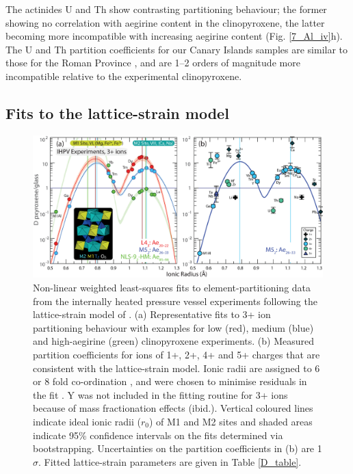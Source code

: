 \documentclass[final,authoryear,3p,times,twocolumn]{elsarticle}
\begin{document}
	The actinides U and Th show contrasting partitioning behaviour; the former showing no correlation with aegirine content in the clinopyroxene, the latter becoming more incompatible with increasing aegirine content (Fig. \ref{7_Al_iv}h). The U and Th partition coefficients for our Canary Islands samples are similar to those for the Roman Province \citep{Wood2001cpx, Fedele2009, Mollo2013, Mollo2016}, and are 1--2 orders of magnitude more incompatible relative to the experimental clinopyroxene.



\subsection{Fits to the lattice-strain model}

        \begin{figure}[tb]
        \begin{center}
        \includegraphics[width=1\textwidth]{8_Latticestrain-01.eps}
        \caption[Lattice-strain fits to  element-partition coefficients]{Non-linear weighted least-squares fits to element-partitioning data from the internally heated pressure vessel experiments following the lattice-strain model of \citet{Blundy1994}. (a) Representative fits to 3+ ion partitioning behaviour with examples for low (red), medium (blue) and high-aegirine (green) clinopyroxene experiments. (b) Measured partition coefficients for ions of 1+, 2+, 4+ and 5+ charges that are consistent with the lattice-strain model. Ionic radii are assigned to 6 or 8 fold co-ordination \citep{Shannon1976}, and were chosen to minimise residuals in the fit \citep[cf.][]{Olin2010}. Y was not included in the fitting routine for 3+ ions because of mass fractionation effects (ibid.).
        Vertical coloured lines indicate ideal ionic radii ($r_0$) of M1 and M2 sites and shaded areas indicate 95\% confidence intervals on the fits determined via bootstrapping. Uncertainties on the partition coefficients in (b) are 1$\sigma$. Fitted lattice-strain parameters are given in Table \ref{D_table}.}
        \label{8_Latticestrain3}
        \end{center}
        \end{figure}
\end{document}
